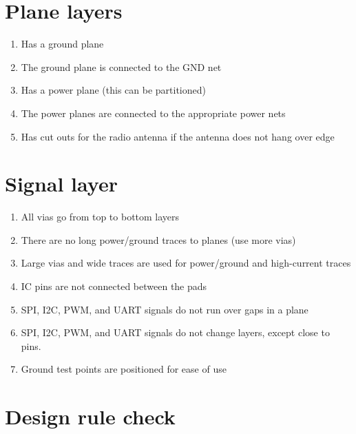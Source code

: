 \documentclass[a4paper, 12pt]{article}
\begin{document}
\pagebreak

\section*{Plane layers}

\begin{enumerate}
\item Has a ground plane

\item The ground plane is connected to the GND net

\item Has a power plane (this can be partitioned)

\item The power planes are connected to the appropriate power nets

\item Has cut outs for the radio antenna if the antenna does not hang
  over edge
\end{enumerate}


\section*{Signal layer}

\begin{enumerate}
\item All vias go from top to bottom layers

\item There are no long power/ground traces to planes (use more vias)

\item Large vias and wide traces are used for power/ground and
  high-current traces

\item IC pins are not connected between the pads

\item SPI, I2C, PWM, and UART signals do not run over gaps in a plane

\item SPI, I2C, PWM, and UART signals do not change layers, except
  close to pins.

\item Ground test points are positioned for ease of use
\end{enumerate}


\section*{Design rule check}
\end{document}
